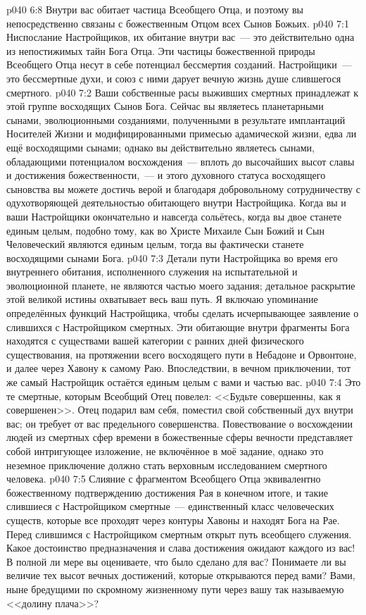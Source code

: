 \vs p040 6:8 Внутри вас обитает частица Всеобщего Отца, и поэтому вы непосредственно связаны с божественным Отцом всех Сынов Божьих.
\vs p040 7:1 Ниспослание Настройщиков, их обитание внутри вас~--- это действительно одна из непостижимых тайн Бога Отца. Эти частицы божественной природы Всеобщего Отца несут в себе потенциал бессмертия созданий. Настройщики~--- это бессмертные духи, и союз с ними дарует вечную жизнь душе слившегося смертного.
\vs p040 7:2 Ваши собственные расы выживших смертных принадлежат к этой группе восходящих Сынов Бога. Сейчас вы являетесь планетарными сынами, эволюционными созданиями, полученными в результате имплантаций Носителей Жизни и модифицированными примесью адамической жизни, едва ли ещё восходящими сынами; однако вы действительно являетесь сынами, обладающими потенциалом восхождения~--- вплоть до высочайших высот славы и достижения божественности,~--- и этого духовного статуса восходящего сыновства вы можете достичь верой и благодаря добровольному сотрудничеству с одухотворяющей деятельностью обитающего внутри Настройщика. Когда вы и ваши Настройщики окончательно и навсегда сольётесь, когда вы двое станете единым целым, подобно тому, как во Христе Михаиле Сын Божий и Сын Человеческий являются единым целым, тогда вы фактически станете восходящими сынами Бога.
\vs p040 7:3 Детали пути Настройщика во время его внутреннего обитания, исполненного служения на испытательной и эволюционной планете, не являются частью моего задания; детальное раскрытие этой великой истины охватывает весь ваш путь. Я включаю упоминание определённых функций Настройщика, чтобы сделать исчерпывающее заявление о слившихся с Настройщиком смертных. Эти обитающие внутри фрагменты Бога находятся с существами вашей категории с ранних дней физического существования, на протяжении всего восходящего пути в Небадоне и Орвонтоне, и далее через Хавону к самому Раю. Впоследствии, в вечном приключении, тот же самый Настройщик остаётся единым целым с вами и частью вас.
\vs p040 7:4 Это те смертные, которым Всеобщий Отец повелел: <<Будьте совершенны, как я совершенен>>. Отец подарил вам себя, поместил свой собственный дух внутри вас;  он требует от вас предельного совершенства. Повествование о восхождении людей из смертных сфер времени в божественные сферы вечности представляет собой интригующее изложение, не включённое в моё задание, однако это неземное приключение должно стать верховным исследованием смертного человека.
\vs p040 7:5 Слияние с фрагментом Всеобщего Отца эквивалентно божественному подтверждению достижения Рая в конечном итоге, и такие слившиеся с Настройщиком смертные~--- единственный класс человеческих существ, которые все проходят через контуры Хавоны и находят Бога на Рае. Перед слившимся с Настройщиком смертным открыт путь всеобщего служения. Какое достоинство предназначения и слава достижения ожидают каждого из вас! В полной ли мере вы оцениваете, что было сделано для вас? Понимаете ли вы величие тех высот вечных достижений, которые открываются перед вами? Вами, ныне бредущими по скромному жизненному пути через вашу так называемую <<долину плача>>?
